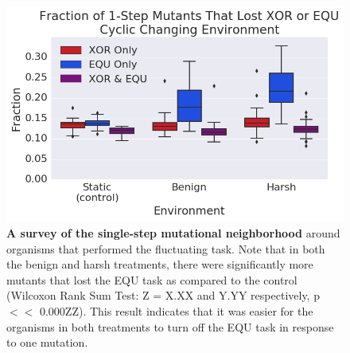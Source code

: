\documentclass[letterpaper]{article}
\begin{document}
\begin{figure}[h!] %
\begin{center}
\includegraphics[trim={0.2cm 0 0 0.2cm},clip,width=1\columnwidth]{figures/CCE_frac_1step__box.png}
\caption{\textbf{A survey of the single-step mutational neighborhood} around organisms that performed the fluctuating task. Note that in both the benign and harsh treatments, there were significantly more mutants that lost the EQU task as compared to the control (Wilcoxon Rank Sum Test: Z = X.XX and Y.YY respectively, p $<<$ 0.000ZZ). This result indicates that it was easier for the organisms in both treatments to turn off the EQU task in response to one mutation. %
}\label{fig:CCE_single_step}
\end{center}
\end{figure}
\end{document}
